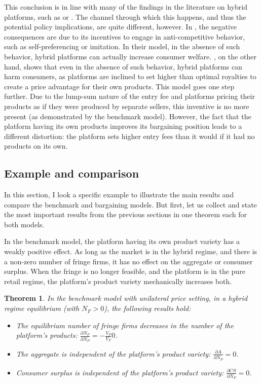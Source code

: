 \documentclass[a4paper]{article}
\newtheorem{theorem}{Theorem}
\begin{document}
This conclusion is in line with many of the findings in the literature on hybrid platforms, such as \textcite{hagiu2022should} or \textcite{anderson2021hybrid}.
The channel through which this happens, and thus the potential policy implications, are quite different, however.
In \textcite{hagiu2022should}, the negative consequences are due to its incentives to engage in anti-competitive behavior, such as self-preferencing or imitation.
In their model, in the absence of such behavior, hybrid platforms can actually increase consumer welfare.
\textcite{anderson2021hybrid}, on the other hand, shows that even in the absence of such behavior, hybrid platforms can harm consumers, as platforms are inclined to set higher than optimal royalties to create a price advantage for their own products.
This model goes one step further.
Due to the lump-sum nature of the entry fee and platforms pricing their products as if they were produced by separate sellers, this inventive is no more present (as demonstrated by the benchmark model).
However, the fact that the platform having its own products improves its bargaining position leads to a different distortion: the platform sets higher entry fees than it would if it had no products on its own.

\subsection{Example and comparison}

In this section, I look a specific example to illustrate the main results and compare the benchmark and bargaining models.
But first, let us collect and state the most important results from the previous sections in one theorem each for both models.

In the benchmark model, the platform having its own product variety has a weakly positive effect.
As long as the market is in the hybrid regime, and there is a non-zero number of fringe firms, it has no effect on the aggregate or consumer surplus.
When the fringe is no longer feasible, and the platform is in the pure retail regime, the platform's product variety mechanically increases both.
\begin{theorem}
    In the benchmark model with unilateral price setting, in a hybrid regime equilibrium (with $N_F > 0$), the following results hold:
    \begin{itemize}
        \item The equilibrium number of fringe firms decreases in the number of the platform's products: $\frac{\partial N_F}{\partial N_P} = -\frac{V_P}{V_F} 0$.
        \item The aggregate is independent of the platform's product variety: $\frac{\partial A}{\partial N_P} = 0$.
        \item Consumer surplus is independent of the platform's product variety: $\frac{\partial CS}{\partial N_P} = 0$.
    \end{itemize}
\end{theorem}
\end{document}
